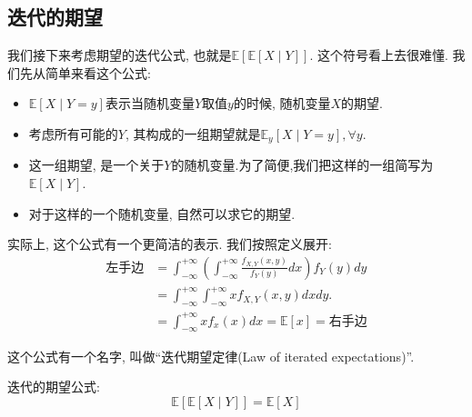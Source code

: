     \subsection{迭代的期望}

    我们接下来考虑期望的迭代公式, 也就是$\mathbb{E}[\mathbb{E}[X \mid Y]]$. 这个符号看上去很难懂. 我们先从简单来看这个公式: 
    \begin{itemize}
        \item $\mathbb{E}[X \mid Y=y]$表示当随机变量$Y$取值$y$的时候, 随机变量$X$的期望. 
        \item 考虑所有可能的$Y$, 其构成的一组期望就是$\mathbb{E}_y[X \mid Y=y], \forall y$. 
        \item 这一组期望, 是一个关于$Y$的随机变量.为了简便,我们把这样的一组简写为$\mathbb{E}[X \mid Y]$.
        \item 对于这样的一个随机变量, 自然可以求它的期望. 
    \end{itemize}

    实际上, 这个公式有一个更简洁的表示. 我们按照定义展开: 
    $$\begin{aligned} \text{左手边} & =\int_{-\infty}^{+\infty}\left(\int_{-\infty}^{+\infty} \frac{f_{X, Y}(x, y)}{f_Y(y)} d x\right) f_Y(y) d y \\ & =\int_{-\infty}^{+\infty} \int_{-\infty}^{+\infty} x f_{X, Y}(x, y) d x d y . \\ & =\int_{-\infty}^{+\infty} x f_x(x) d x=\mathbb{E}[x]=\text{右手边}\end{aligned}$$

    这个公式有一个名字, 叫做``迭代期望定律(Law of iterated expectations)''. 

    \begin{theorem}
        迭代的期望公式:$$
\mathbb{E}[{\mathbb{E}}[X \mid Y]]=\mathbb{E}[X]
$$
    \end{theorem}

